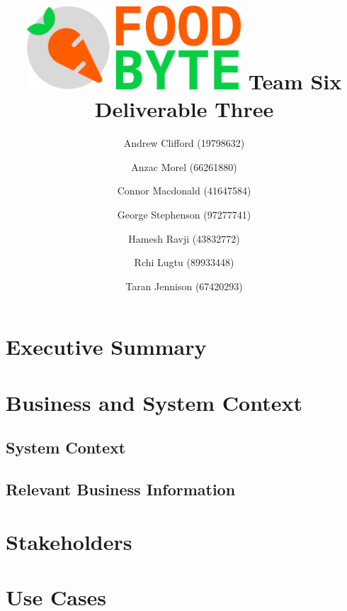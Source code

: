\documentclass{article}
\begin{document}
	\title{\includegraphics[width=8cm]{images/logo_main.png}\linebreak
		   Team Six Deliverable Three}
	\author{Andrew Clifford (19798632)
		    \and Anzac Morel (66261880)
	    	\and Connor Macdonald (41647584)
    		\and George Stephenson (97277741)
    		\and Hamesh Ravji (43832772)
    		\and Rchi Lugtu (89933448)
    		\and Taran Jennison (67420293)}
	\maketitle
	\pagebreak
	\tableofcontents
	\pagebreak
	
	\section{Executive Summary} 
	
	\pagebreak
	
	\section{Business and System Context}
	
	
	\subsection{System Context}
	
	
	\subsection{Relevant Business Information}
		
	
	\pagebreak
	
	\section{Stakeholders}
	
	\pagebreak
	
	\section{Use Cases}
	
	\pagebreak
	
\end{document}

